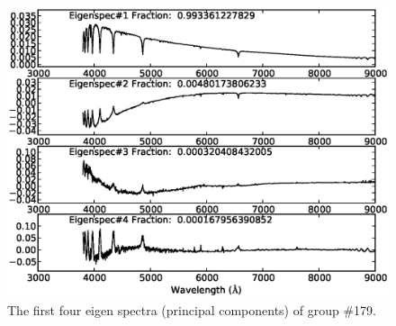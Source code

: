 \documentclass[manuscript]{aastex}
\begin{document}
\begin{figure}
   \centering
   \includegraphics[width=14cm, angle=0,clip]{f72.eps}
   \caption{The first four eigen spectra (principal components) of group \#179.
   }
   \label{Fig72}
\end{figure}
\end{document}
